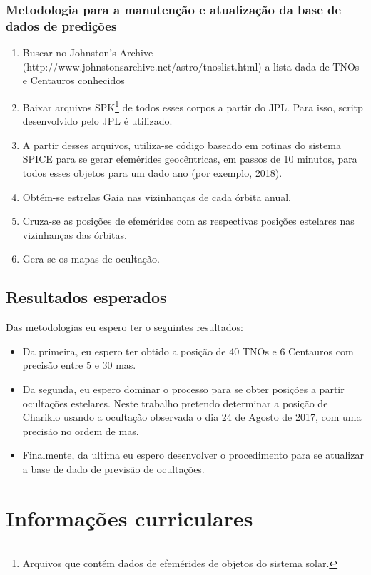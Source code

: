 \documentclass[a4paper, 11pt]{article}
\begin{document}
\subsubsection{Metodologia para a manuten\c c\~ao e atualiza\c c\~ao da base de dados de predi\c c\~oes}
\begin{enumerate}
  \item Buscar no Johnston's Archive (http://www.johnstonsarchive.net/astro/tnoslist.html) a lista dada de TNOs e Centauros conhecidos
  \item Baixar arquivos SPK\footnote{Arquivos que cont\'em dados de efem\'erides de objetos do sistema solar.} de todos esses corpos a partir do JPL. Para isso, scritp desenvolvido pelo JPL \'e utilizado.
  \item A partir desses arquivos, utiliza-se c\'odigo baseado em rotinas do sistema SPICE para se gerar efem\'erides geoc\^entricas, em passos de 10 minutos, para todos esses objetos para um dado ano (por exemplo, 2018).
  \item Obt\'em-se estrelas Gaia nas vizinhan\c cas de cada \'orbita anual.
  \item Cruza-se as posi\c c\~oes de efem\'erides com as respectivas posi\c c\~oes estelares nas vizinhan\c cas das \'orbitas.
  \item Gera-se os mapas de oculta\c c\~ao.
\end{enumerate}

\subsection{Resultados esperados}

Das metodologias eu espero ter o seguintes resultados:
\begin{itemize}
  \item Da primeira, eu espero ter obtido a posição de 40 TNOs e 6 Centauros com precisão entre 5 e 30 mas.
  \item Da segunda, eu espero dominar o processo para se obter posições a partir ocultações estelares. Neste trabalho pretendo determinar a posição de Chariklo usando a ocultação observada o dia 24 de Agosto de 2017, com uma precisão no ordem de mas. 
  \item Finalmente, da ultima eu espero desenvolver o procedimento para se atualizar a base de dado de previsão de ocultações.    
\end{itemize}



\section{Informa\c{c}\~oes curriculares}
\end{document}
